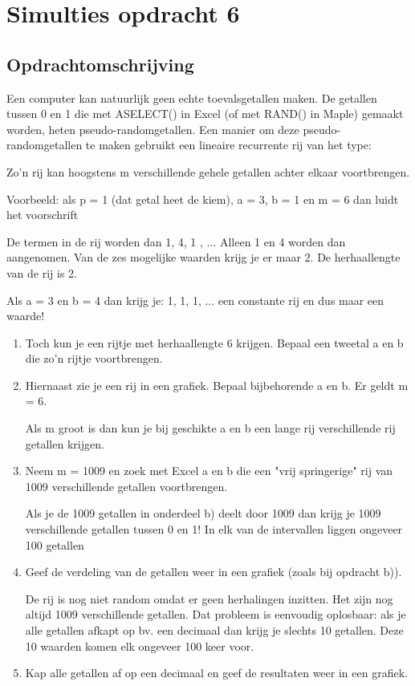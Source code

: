 \documentclass{article}
\begin{document}



\section{Simulties opdracht 6}
\label{sec:sample_main}

\subsection{Opdrachtomschrijving}
\label{subsec:sample_opdrom}

Een computer kan natuurlijk geen echte toevalsgetallen maken. De getallen tussen 0 en 1 die  
met ASELECT() in Excel (of met RAND() in Maple) gemaakt worden, heten pseudo-randomgetallen. Een manier om deze pseudo-randomgetallen te maken gebruikt een lineaire recurrente rij van het type: 
 
Zo'n rij kan hoogstens m verschillende gehele getallen achter elkaar voortbrengen. 
 
Voorbeeld: als p = 1 (dat getal heet de kiem), a = 3, b = 1 en m = 6 dan luidt het voorschrift 
 
De termen in de rij worden dan 1, 4, 1 , ... Alleen 1 en 4 worden dan aangenomen. Van de zes mogelijke waarden krijg je er maar 2. De herhaallengte van de rij is 2.  
 
Als a = 3 en b = 4 dan krijg je: 1, 1, 1, ... een constante rij en dus maar een waarde! 
 
 
\begin{enumerate}[label=(\Alph*)]
\item Toch kun je een rijtje met herhaallengte 6 krijgen. Bepaal een tweetal a en b die zo'n rijtje voortbrengen.  
 
\item Hiernaast zie je een rij in een grafiek. Bepaal bijbehorende a en b. Er geldt m = 6. 
 
Als m groot is dan kun je bij geschikte a en b een lange rij verschillende rij getallen krijgen.  
 
\item Neem m = 1009 en zoek met Excel a en b die een "vrij springerige" rij van 1009 verschillende getallen voortbrengen. 
 
Als je de 1009 getallen in onderdeel b) deelt door 1009 dan krijg je 1009 verschillende getallen tussen 0 en 1! In elk van de intervallen liggen ongeveer 100 getallen 
  
\item Geef de verdeling van de getallen weer in een grafiek (zoals bij opdracht b)).  
 
De rij is nog niet random omdat er geen herhalingen inzitten. Het zijn nog altijd 1009 verschillende getallen. Dat probleem is eenvoudig oplosbaar: als je alle getallen afkapt op bv. een decimaal dan krijg je slechts 10 getallen. Deze 10 waarden komen elk ongeveer 100 keer voor.  
 
\item Kap alle getallen af op een decimaal en geef de resultaten weer in een grafiek.  
 
\end{enumerate}
\end{document}
